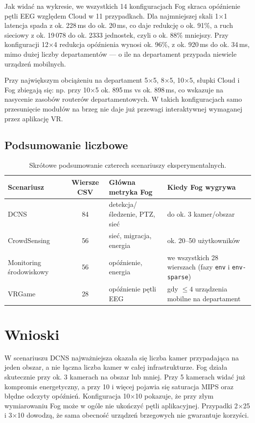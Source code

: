 \documentclass[
    oneside,            %
    left=2.5cm,         %
    right=2.5cm,        %
    top=2.5cm,          %
    bottom=3cm,         %
    bindingoffset=6mm,  %
    nohyphenation=false %
]{eiti/eiti-report}
\begin{document}
Jak widać na wykresie, we wszystkich 14 konfiguracjach Fog skraca opóźnienie pętli EEG względem Cloud w 11 przypadkach. Dla najmniejszej skali 1$\times$1 latencja spada z ok. 228\,ms do ok. 20\,ms, co daje redukcję o ok. 91\%, a ruch sieciowy z ok. 19\,078 do ok. 2333 jednostek, czyli o ok. 88\% mniejszy. Przy konfiguracji 12$\times$4 redukcja opóźnienia wynosi ok. 96\%, z ok. 920\,ms do ok. 34\,ms, mimo dużej liczby departamentów --- o ile na departament przypada niewiele urządzeń mobilnych.

Przy największym obciążeniu na departament 5$\times$5, 8$\times$5, 10$\times$5, słupki Cloud i Fog zbiegają się: np. przy 10$\times$5 ok. 895\,ms vs ok. 898\,ms, co wskazuje na nasycenie zasobów routerów departamentowych. W takich konfiguracjach samo przesunięcie modułów na brzeg nie daje już przewagi interaktywnej wymaganej przez aplikację VR.

\subsection{Podsumowanie liczbowe}
\begin{table}[htbp]
\centering
\scriptsize
\setlength{\tabcolsep}{3pt}
\renewcommand{\arraystretch}{1.1}
\begin{tabularx}{\textwidth}{|>{\raggedright\arraybackslash}p{}|c|>{\raggedright\arraybackslash}p{}|>{\raggedright\arraybackslash}X|}
\hline
Scenariusz & Wiersze CSV & Główna metryka Fog & Kiedy Fog wygrywa \\
\hline
DCNS & 84 & detekcja/śledzenie, PTZ, sieć & do ok. 3 kamer/obszar \\
CrowdSensing & 56 & sieć, migracja, energia & ok. 20--50 użytkowników \\
Monitoring środowiskowy & 56 & opóźnienie, energia & we wszystkich 28 wierszach (fazy \texttt{env} i \texttt{env-sparse}) \\
VRGame & 28 & opóźnienie pętli EEG & gdy $\leq 4$ urządzenia mobilne na departament \\
\hline
\end{tabularx}
\caption{Skrótowe podsumowanie czterech scenariuszy eksperymentalnych.}
\end{table}

\section{Wnioski}
W scenariuszu DCNS najważniejsza okazała się liczba kamer przypadająca na jeden obszar, a nie łączna liczba kamer w całej infrastrukturze. Fog działa skutecznie przy ok. 3 kamerach na obszar lub mniej. Przy 5 kamerach widać już kompromis energetyczny, a przy 10 i więcej pojawia się saturacja MIPS oraz błędne odczyty opóźnień. Konfiguracja 10$\times$10 pokazuje, że przy złym wymiarowaniu Fog może w ogóle nie ukończyć pętli aplikacyjnej. Przypadki 2$\times$25 i 3$\times$10 dowodzą, że sama obecność urządzeń brzegowych nie gwarantuje korzyści.
\end{document}
